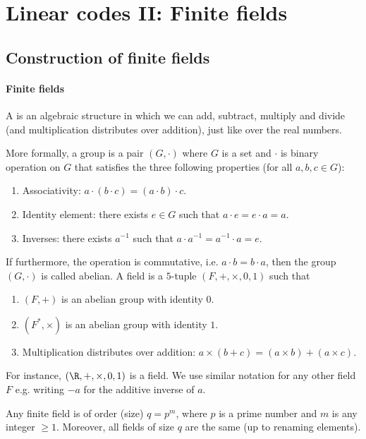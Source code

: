 \documentclass[a4paper, 11pt, openany]{book}
\begin{document}
\section{Linear codes II: Finite fields}
\label{sec:22}



\subsection{Construction of finite fields}

\paragraph{Finite fields}
A  is an algebraic structure in which we can add, subtract, multiply and divide (and multiplication distributes over addition), just like over the real numbers.


More formally, a group is a pair $(G, \cdot)$ where $G$ is a set and $\cdot$ is binary operation on $G$ that satisfies the three following properties (for all $a,b,c \in G$):
\begin{enumerate}
    \item Associativity: $a \cdot (b \cdot c) = (a \cdot b) \cdot c$.

    \item Identity element: there exists $e \in G$ such that $a \cdot e = e \cdot a = a$.

    \item Inverses: there exists $a^{-1}$ such that $a \cdot a^{-1} = a^{-1} \cdot a = e$.
\end{enumerate}
If furthermore, the operation is commutative, i.e. $a \cdot b = b \cdot a$, then the group $(G, \cdot)$ is called abelian. A field is a $5$-tuple $(F, +, \times, 0, 1)$ such that
\begin{enumerate}
    \item $(F, +)$ is an abelian group with identity $0$.

    \item $(F^*, \times)$ is an abelian group with identity $1$.

    \item Multiplication distributes over addition: $a \times (b + c) = (a \times b) + (a \times c)$.
\end{enumerate}
For instance, $(\R, +, \times, 0, 1)$ is a field. We use similar notation for any other field $F$ e.g. writing $-a$ for the additive inverse of $a$.


\begin{theorem}[Galois] Any finite field is of order (size) $q = p^m$, where $p$ is a prime number and $m$ is any integer $\ge 1$. Moreover, all fields of size $q$ are the same (up to renaming elements).
\end{theorem}
\end{document}
